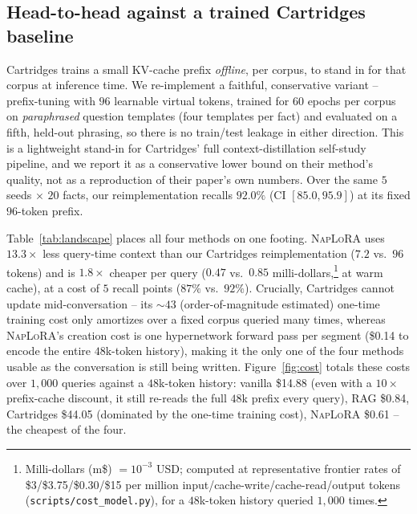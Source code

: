 \documentclass[11pt]{article}
\newcommand{\naplora}{\textsc{NapLoRA}}
\newcommand{\mt}[1]{\texttt{\small #1}}
\begin{document}
\subsection{Head-to-head against a trained Cartridges baseline}
\label{sec:cartridges}

Cartridges \citep{eyuboglu2025cartridges} trains a small KV-cache prefix \emph{offline}, per corpus, to stand in for that corpus at inference time. We re-implement a faithful, conservative variant -- prefix-tuning \citep{li2021prefixtuning} with $96$ learnable virtual tokens, trained for $60$ epochs per corpus on \emph{paraphrased} question templates (four templates per fact) and evaluated on a fifth, held-out phrasing, so there is no train/test leakage in either direction. This is a lightweight stand-in for Cartridges' full context-distillation self-study pipeline, and we report it as a conservative lower bound on their method's quality, not as a reproduction of their paper's own numbers. Over the same $5$ seeds $\times$ $20$ facts, our reimplementation recalls $92.0\%$ (CI $[85.0,95.9]$) at its fixed $96$-token prefix.

Table~\ref{tab:landscape} places all four methods on one footing. \naplora{} uses $13.3\times$ less query-time context than our Cartridges reimplementation ($7.2$ vs.\ $96$ tokens) and is $1.8\times$ cheaper per query ($0.47$ vs.\ $0.85$ milli-dollars,\footnote{Milli-dollars (m\$) $=10^{-3}$ USD; computed at representative frontier rates of \$3/\$3.75/\$0.30/\$15 per million input/cache-write/cache-read/output tokens (\mt{scripts/cost\_model.py}), for a $48$k-token history queried $1{,}000$ times.} at warm cache), at a cost of $5$ recall points ($87\%$ vs.\ $92\%$). Crucially, Cartridges cannot update mid-conversation -- its $\sim\!43$ (order-of-magnitude estimated) one-time training cost only amortizes over a fixed corpus queried many times, whereas \naplora{}'s creation cost is one hypernetwork forward pass per segment (\$0.14 to encode the entire $48$k-token history), making it the only one of the four methods usable as the conversation is still being written. Figure~\ref{fig:cost} totals these costs over $1{,}000$ queries against a $48$k-token history: vanilla \$14.88 (even with a $10\times$ prefix-cache discount, it still re-reads the full $48$k prefix every query), RAG \$0.84, Cartridges \$44.05 (dominated by the one-time training cost), \naplora{} \$0.61 -- the cheapest of the four.
\end{document}
